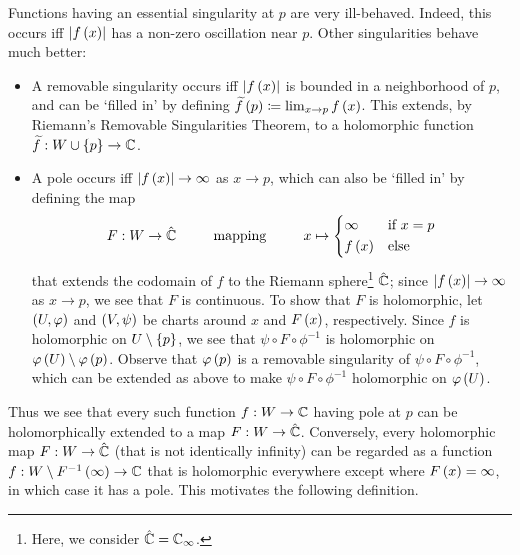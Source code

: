 \documentclass[../Moduli_Spaces_of_Riemann_Surfaces.tex]{subfiles}
\begin{document}
    \begin{remark}
        Functions having an essential singularity at $p$ are very ill-behaved. Indeed, this occurs iff $\left|f\left(x\right)\right|$ has a non-zero oscillation near $p$. Other singularities behave much better:
        \begin{itemize}
            \item A removable singularity occurs iff $\left|f\left(x\right)\right|$ is bounded in a neighborhood of $p$, and can be $\textrm{`}$filled in$\textrm{'}$ by defining $\widetilde{f}\left(p\right)\coloneqq\lim_{x\to p}f\left(x\right)$. This extends, by Riemann's Removable Singularities Theorem, to a holomorphic function $\widetilde{f}:W\cup\left\{p\right\}\to\mathbb{C}$.
            \vspace{-0.08in}
            \item A pole occurs iff $\left|f\left(x\right)\right|\to\infty$ as $x\to p$, which can also be $\textrm{`}$filled in$\textrm{'}$ by defining the map
                \begin{equation*}
                    F:W\to\RS\ \ \ \ \ \ \ \ \textrm{mapping}\ \ \ \ \ \ \ \ x\mapsto
                    \begin{dcases}
                        \infty & \textrm{if }x=p \\
                        f\l(x\r) & \textrm{else}
                    \end{dcases}
                \end{equation*}
                that extends the codomain of $f$ to the Riemann sphere\footnote{Here, we consider $\hat{\mathbb{C}}=\mathbb{C}_\infty$.} $\hat{\mathbb{C}}$; since $\left|f\left(x\right)\right|\to\infty$ as $x\to p$, we see that $F$ is continuous. To show that $F$ is holomorphic, let $\left(U,\varphi\right)$ and $\left(V,\psi\right)$ be charts around $x$ and $F\left(x\right)$, respectively. Since $f$ is holomorphic on $U\setminus\left\{p\right\}$, we see that $\psi\circ F\circ\phi^{-1}$ is holomorphic on $\varphi\left(U\right)\setminus\varphi\left(p\right)$. Observe that $\varphi\left(p\right)$ is a removable singularity of $\psi\circ F\circ\phi^{-1}$, which can be extended as above to make $\psi\circ F\circ\phi^{-1}$ holomorphic on $\varphi\left(U\right)$.
        \end{itemize}
        Thus we see that every such function $f:W\to\mathbb{C}$ having pole at $p$ can be holomorphically extended to a map $F:W\to\hat{\mathbb{C}}$. Conversely, every holomorphic map $F:W\to\hat{\mathbb{C}}$ (that is not identically infinity) can be regarded as a function $f:W\setminus F^{-1}\left(\infty\right)\to\mathbb{C}$ that is holomorphic everywhere except where $F\left(x\right)=\infty$, in which case it has a pole. This motivates the following definition.\exqed
    \end{remark}
\end{document}
